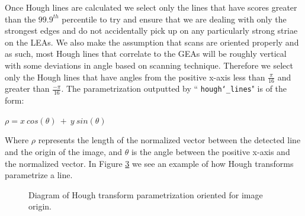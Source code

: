 \documentclass[12pt]{article}
\theoremstyle{nonumberplain}
\begin{document}
Once Hough lines are calculated we select only the lines that have scores greater than the $99.9^{th}$ percentile to try and ensure that we are dealing with only the strongest edges and do not accidentally pick up on any particularly strong striae on the LEAs. We also make the assumption that scans are oriented properly and as such, most Hough lines that correlate to the GEAs will be roughly vertical with some deviations in angle based on scanning technique. Therefore we select only the Hough lines that have angles from the positive x-axis less than $\frac{\pi}{16}$ and greater than $\frac{-\pi}{16}$. The parametrization outputted by `` \texttt{hough\char`_lines}" is of the form:

\begin{center}
$\rho = x \ cos(\theta) \ + \ y \ sin(\theta)$
\end{center}

Where $\rho$ represents the length of the normalized vector between the detected line and the origin of the image, and $\theta$ is the angle between the positive x-axis and the normalized vector. In Figure \ref{fig: parametrization} we see an example of how Hough transforms parametrize a line.

\begin{figure}[!ht]
  \begin{subfigure}{.5\textwidth}
    \centering
  \label{fig: tikz1}
  \end{subfigure}
  \begin{subfigure}{.5\textwidth}
    \centering
    \label{fig: tikz2}
  \end{subfigure}
  \caption{Diagram of Hough transform parametrization oriented for image origin.}
  \label{fig: parametrization}
\end{figure}
\end{document}
